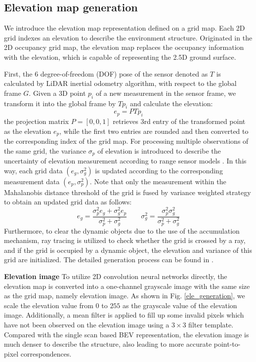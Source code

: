 \documentclass[letterpaper, 10 pt, conference]{ieeeconf}  \usepackage{tabularx}
\begin{document}
\subsection{Elevation map generation}

We introduce the elevation map representation defined on a grid map. Each 2D grid indexes an elevation to describe the environment structure. Originated in the 2D occupancy grid map, the elevation map replaces the occupancy information with the elevation, which is capable of representing the 2.5D ground surface.

First, the 6 degree-of-freedom (DOF) pose of the sensor denoted as $T$ is calculated by LiDAR inertial odometry algorithm, with respect to the global frame $G$. Given a 3D point $p_i$ of a new measurement in the sensor frame, we transform it into the global frame by $T p_i$ and calculate the elevation:
\begin{equation}\label{eq1}
e_p = P T p_i
\end{equation}
the projection matrix $P = [0,0,1]$ retrieves 3rd entry of the transformed point as the elevation $e_p$, while the first two entries are rounded and then converted to the corresponding index of the grid map. For processing multiple observations of the same grid, the variance $\sigma_{p}$ of elevation is introduced to describe the uncertainty of elevation measurement according to range sensor models \cite{fankhauser2015kinect}. In this way, each grid data $({e_g}, \sigma_{g}^{2})$ is updated according to the corresponding measurement data $({e_p}, \sigma_{p}^{2})$. Note that only the measurement within the Mahalanobis distance threshold of the grid is fused by variance weighted strategy to obtain an updated grid data as follows:
\begin{equation}\label{eq3}
{e_g} = \frac{\sigma_{p}^{2}{e_g}+\sigma_{g}^{2}e_p}{\sigma_{p}^{2}+\sigma_{g}^{2}} \qquad
\sigma_{g}^{2} = \frac{\sigma_{p}^{2}\sigma_{g}^{2}}{\sigma_{p}^{2}+\sigma_{g}^{2}}
\end{equation}
Furthermore, to clear the dynamic objects due to the use of the accumulation mechanism, ray tracing is utilized to check whether the grid is crossed by a ray, and if the grid is occupied by a dynamic object, the elevation and variance of this grid are initialized. The detailed generation process can be found in \cite{pan2020gem}.

\textbf{Elevation image} To utilize 2D convolution neural networks directly, the elevation map is converted into a one-channel grayscale image with the same size as the grid map, namely elevation image. As shown in Fig. \ref{ele_generation}, we scale the elevation value from $0$ to $255$ as the grayscale value of the elevation image. Additionally, a mean filter is applied to fill up some invalid pixels which have not been observed on the elevation image using a $3\times3$ filter template. Compared with the single scan based BEV representation, the elevation image is much denser to describe the structure, also leading to more accurate point-to-pixel correspondences.
\end{document}
